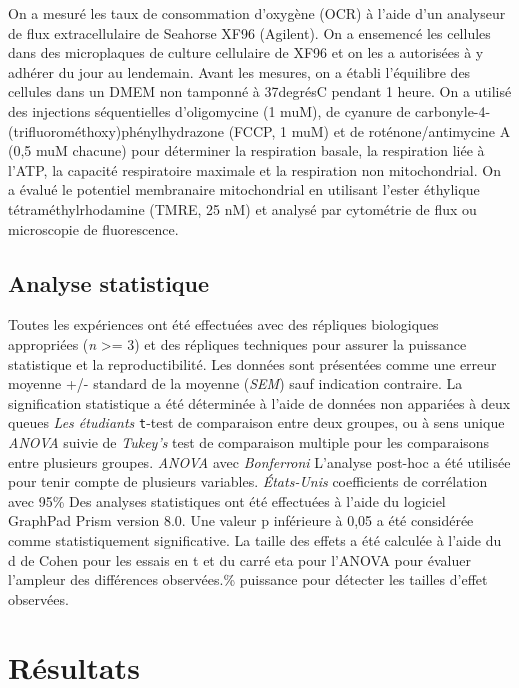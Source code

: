 \documentclass[11pt,a4paper]{article}
\begin{document}
On a mesuré les taux de consommation d'oxygène (OCR) à l'aide d'un analyseur de flux extracellulaire de Seahorse XF96 (Agilent). On a ensemencé les cellules dans des microplaques de culture cellulaire de XF96 et on les a autorisées à y adhérer du jour au lendemain. Avant les mesures, on a établi l'équilibre des cellules dans un DMEM non tamponné à 37degrésC pendant 1 heure. On a utilisé des injections séquentielles d'oligomycine (1 muM), de cyanure de carbonyle-4-(trifluorométhoxy)phénylhydrazone (FCCP, 1 muM) et de roténone/antimycine A (0,5 muM chacune) pour déterminer la respiration basale, la respiration liée à l'ATP, la capacité respiratoire maximale et la respiration non mitochondrial. On a évalué le potentiel membranaire mitochondrial en utilisant l'ester éthylique tétraméthylrhodamine (TMRE, 25 nM) et analysé par cytométrie de flux ou microscopie de fluorescence.

\subsection{Analyse statistique}

Toutes les expériences ont été effectuées avec des répliques biologiques appropriées (\textit{n} >= 3) et des répliques techniques pour assurer la puissance statistique et la reproductibilité. Les données sont présentées comme une erreur moyenne +/- standard de la moyenne (\textit{SEM}) sauf indication contraire. La signification statistique a été déterminée à l'aide de données non appariées à deux queues \textit{Les étudiants} \texttt{t}-test de comparaison entre deux groupes, ou à sens unique \textit{ANOVA} suivie de \textit{Tukey's} test de comparaison multiple pour les comparaisons entre plusieurs groupes. \textit{ANOVA} avec \textit{Bonferroni} L'analyse post-hoc a été utilisée pour tenir compte de plusieurs variables. \textit{États-Unis} coefficients de corrélation avec 95\% Des analyses statistiques ont été effectuées à l'aide du logiciel GraphPad Prism version 8.0. Une valeur p inférieure à 0,05 a été considérée comme statistiquement significative. La taille des effets a été calculée à l'aide du d de Cohen pour les essais en t et du carré eta pour l'ANOVA pour évaluer l'ampleur des différences observées.\% puissance pour détecter les tailles d'effet observées.

\section{Résultats}
\end{document}
